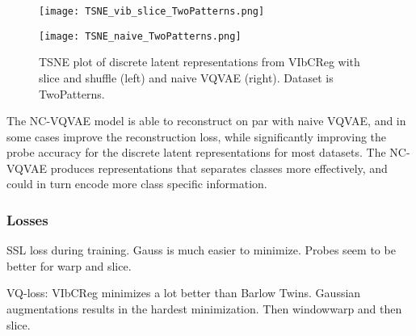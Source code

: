 \documentclass[../../thesis.tex]{subfiles}
\begin{document}
\begin{figure}[H]
    \label{fig:TSNE_TwoPatterns}
    \centering
    \begin{minipage}[b]{0.49\textwidth}
        \centering
        \texttt{[image: TSNE\_vib\_slice\_TwoPatterns.png]}
    \end{minipage}
    \hfill
    \begin{minipage}[b]{0.49\textwidth}
        \centering
        \texttt{[image: TSNE\_naive\_TwoPatterns.png]}
    \end{minipage}
    \caption{TSNE plot of discrete latent representations from VIbCReg with slice and shuffle (left) and naive VQVAE (right). Dataset is TwoPatterns.}
\end{figure}








The NC-VQVAE model is able to reconstruct on par with naive VQVAE, and in some cases improve the reconstruction loss, while significantly improving the probe accuracy for the discrete latent representations for most datasets. The NC-VQVAE produces representations that separates classes more effectively, and could in turn encode more class specific information.

\subsubsection{Losses}

SSL loss during training. Gauss is much easier to minimize. Probes seem to be better for warp and slice.\newline 

VQ-loss: VIbCReg minimizes a lot better than Barlow Twins. Gaussian augmentations results in the hardest minimization. Then windowwarp and then slice. \newline
\end{document}
